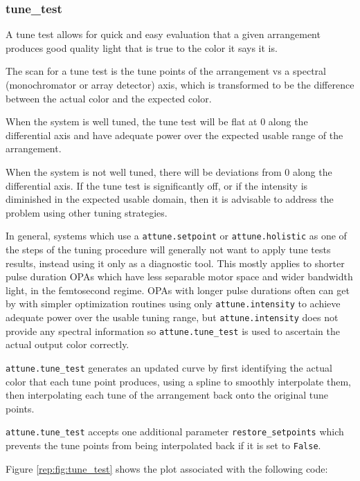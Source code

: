 \hypertarget{tune_test}{%
\subsubsection{tune\_test}\label{tune_test}}

A tune test allows for quick and easy evaluation that a given
arrangement produces good quality light that is true to the color it
says it is.

The scan for a tune test is the tune points of the arrangement vs a
spectral (monochromator or array detector) axis, which is transformed to
be the difference between the actual color and the expected color.

When the system is well tuned, the tune test will be flat at 0 along the
differential axis and have adequate power over the expected usable range
of the arrangement.

When the system is not well tuned, there will be deviations from 0 along
the differential axis. If the tune test is significantly off, or if the
intensity is diminished in the expected usable domain, then it is
advisable to address the problem using other tuning strategies.

In general, systems which use a
\texttt{attune.setpoint} or
\texttt{attune.holistic} as one of the steps of the
tuning procedure will generally not want to apply tune tests results,
instead using it only as a diagnostic tool. This mostly applies to
shorter pulse duration OPAs which have less separable motor space and
wider bandwidth light, in the femtosecond regime. OPAs with longer pulse
durations often can get by with simpler optimization routines using only
\texttt{attune.intensity} to achieve adequate power
over the usable tuning range, but
\texttt{attune.intensity} does not provide any spectral
information so \texttt{attune.tune\_test} is used to
ascertain the actual output color correctly.

\texttt{attune.tune\_test} generates an updated curve
by first identifying the actual color that each tune point produces,
using a spline to smoothly interpolate them, then interpolating each
tune of the arrangement back onto the original tune points.

\texttt{attune.tune\_test} accepts one additional
parameter \texttt{restore\_setpoints} which prevents the tune points
from being interpolated back if it is set to \texttt{False}.

Figure \ref{rep:fig:tune_test} shows the plot associated with the following code:

